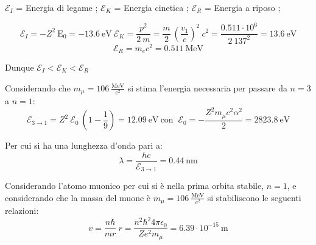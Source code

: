 \documentclass[12pt,twoside,a4]{article}
\begin{document}
\begin{solution}

$ \mathcal{E}_I $ = Energia di legame ; $ \mathcal{E}_K $ = Energia cinetica ; $ \mathcal{E}_R $ = Energia a riposo ;

\begin{equation*}
\mathcal{E}_I = - Z^2 \ \mathrm{E}_0 = - 13.6 \ \mathrm{eV}    \   \mathcal{E}_K = \frac{p^2}{2 \ m} = \frac{m}{2} \ \left(\frac{v_1}{c}\right)^2 \ c^2 = \frac{0.511 \cdot 10^6}{2 \ 137^2} = 13.6 \ \mathrm{eV}    
\end{equation*}
\begin{equation*}
 \mathcal{E}_R = m_e c^2 = 0.511 \ \mathrm{MeV}   
\end{equation*}

\medskip
Dunque $\mathcal{E}_I < \mathcal{E}_K < \mathcal{E}_R$
\end{solution}




\begin{solution}
	Considerando che $m_\mu = 106 \ \frac{\mathrm{MeV}}{\mathrm{c}^2}$ si stima l'energia necessaria per passare da $n = 3$ a $n = 1$: \begin{equation*}
\mathcal{E}_{3\rightarrow 1} = {Z^2 \ \mathcal{E}_0} \ \left(1- \frac{1}{9} \right) = 12.09 \ \mathrm{eV}  \  \text{con }  \  \mathcal{E}_0 = - \frac{Z^2 m_\mu c^2 \alpha^2}{2} = 2823.8 \ \mathrm{eV}   
\end{equation*}
 
Per cui si ha una lunghezza d'onda pari a: 
\begin{equation*}
\lambda = \frac{h c}{\mathcal{E}_{3\rightarrow 1}} = 0.44 \ \mathrm{nm}     
\end{equation*}
\end{solution}

\newpage
\begin{solution}
Considerando l'atomo muonico per cui si è nella prima orbita stabile, $n =1$, e considerando che la massa del muone è $m_\mu = 106 \ \frac{\mathrm{MeV}}{c^2}$ si stabiliscono le seguenti relazioni: \begin{equation*}
 v = \frac{n \hbar}{m r}  \  r = \frac{n^2 \hbar^2 4 \pi \epsilon_0}{Z e^2 m_\mu} = 6.39 \cdot 10^{-15} \ \mathrm{m}  
\end{equation*}
\end{solution}
\end{document}

